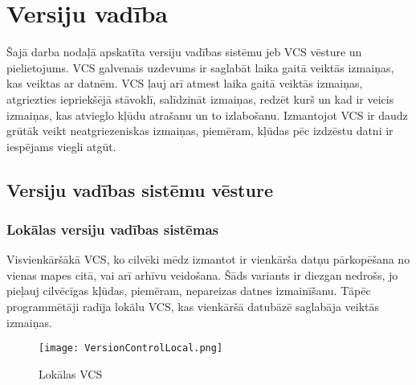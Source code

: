 \chapter{Versiju vadība}


Šajā darba nodaļā apskatīta versiju vadības sistēmu jeb VCS vēsture un pielietojums. VCS galvenais uzdevums ir saglabāt laika gaitā veiktās izmaiņas, kas veiktas ar datnēm. VCS ļauj arī atmest laika gaitā veiktās izmaiņas, atgriezties iepriekšējā stāvoklī, salīdzināt izmaiņas, redzēt kurš un kad ir veicis izmaiņas, kas atvieglo kļūdu atrašanu un to izlabošanu. Izmantojot VCS ir daudz grūtāk veikt neatgriezeniskas izmaiņas, piemēram, kļūdas pēc izdzēstu datni ir iespējams viegli atgūt.

\section{Versiju vadības sistēmu vēsture}
\cite[chapter, p.~27]{chacon2014progit}
\subsection{Lokālas versiju vadības sistēmas}
Visvienkāršākā VCS, ko cilvēki mēdz izmantot ir vienkārša datņu pārkopēšana no vienas mapes citā, vai arī arhīvu veidošana. Šāds variants ir diezgan nedrošs, jo pieļauj cilvēcīgas kļūdas, piemēram, nepareizas datnes izmainīšanu. Tāpēc programmētāji radīja lokālu VCS, kas vienkāršā datubāzē saglabāja veiktās izmaiņas.
\begin{figure}[H]%
	\centering
	\captionsetup{justification=centering}
	\texttt{[image: VersionControlLocal.png]}
	\caption{Lokālas VCS}
	\label{fig:VersionControlLocal}
\end{figure}

